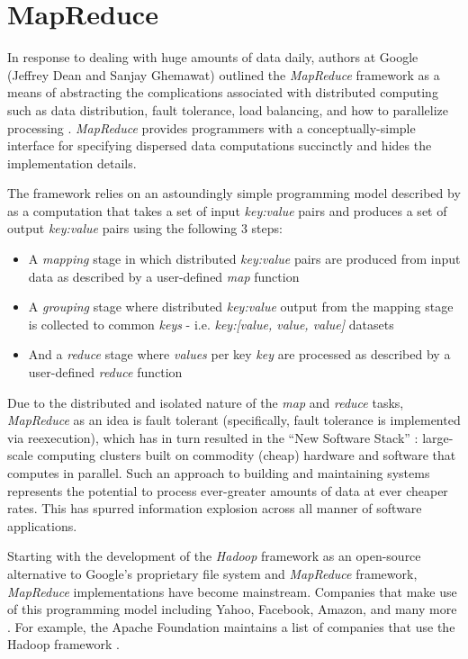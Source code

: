 \section{MapReduce}
In response to dealing with huge amounts of data daily, authors at Google (Jeffrey Dean and Sanjay Ghemawat) outlined the \textit{MapReduce} framework as a means of abstracting the complications associated with distributed computing such as data distribution, fault tolerance, load balancing, and how to parallelize processing \cite{Dean:2008}. \textit{MapReduce} provides programmers with a conceptually-simple interface for specifying dispersed data computations succinctly and hides the implementation details.

The framework relies on an astoundingly simple programming model described by \cite{Dean:2008} as a computation that takes a set of input \textit{key:value} pairs and produces a set of output \textit{key:value} pairs using the following 3 steps:

\begin{itemize}
    \item A \textit{mapping} stage in which distributed \textit{key:value} pairs are produced from input data as described by a user-defined \textit{map} function
    \item A \textit{grouping} stage where distributed \textit{key:value} output from the mapping stage is collected to common \textit{keys} - i.e. \textit{key:[value, value, value]} datasets
    \item And a \textit{reduce} stage where \textit{values} per key \textit{key} are processed as described by a user-defined \textit{reduce} function
\end{itemize}

Due to the distributed and isolated nature of the \textit{map} and \textit{reduce} tasks, \textit{MapReduce} as an idea is fault tolerant (specifically, fault tolerance is implemented via reexecution), which has in turn resulted in the ``New Software Stack'' \cite{mining2011}: large-scale computing clusters built on commodity (cheap) hardware and software that computes in parallel. Such an approach to building and maintaining systems represents the potential to process ever-greater amounts of data at ever cheaper rates. This has spurred information explosion across all manner of software applications.

Starting with the development of the \textit{Hadoop} framework as an open-source alternative to Google's proprietary file system and \textit{MapReduce} framework, \textit{MapReduce} implementations have become mainstream. Companies that make use of this programming model including Yahoo, Facebook, Amazon, and many more \cite{chandar2010}. For example, the Apache Foundation maintains a list of companies that use the Hadoop framework \cite{hadoopPower:2017}.

